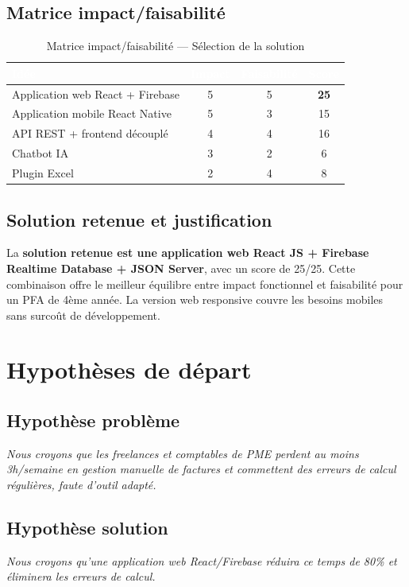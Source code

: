 \subsection{Matrice impact/faisabilité}

\begin{table}[H]
\centering
\caption{Matrice impact/faisabilité — Sélection de la solution}
\label{tab:matrice_impact}
\begin{tabular}{|l|c|c|c|}
\hline
\rowcolor{emsiblue}\textcolor{white}{\textbf{Idée}} & \textcolor{white}{\textbf{Impact}} & \textcolor{white}{\textbf{Faisabilité}} & \textcolor{white}{\textbf{Score}} \\
\hline
Application web React + Firebase & 5 & 5 & \textbf{25} \\
Application mobile React Native & 5 & 3 & 15 \\
API REST + frontend découplé & 4 & 4 & 16 \\
Chatbot IA & 3 & 2 & 6 \\
Plugin Excel & 2 & 4 & 8 \\
\hline
\end{tabular}
\end{table}

\subsection{Solution retenue et justification}

La \textbf{solution retenue est une application web React JS + Firebase Realtime Database + JSON Server}, avec un score de 25/25. Cette combinaison offre le meilleur équilibre entre impact fonctionnel et faisabilité pour un PFA de 4ème année. La version web responsive couvre les besoins mobiles sans surcoût de développement.

\section{Hypothèses de départ}

\subsection{Hypothèse problème}
\textit{Nous croyons que les freelances et comptables de PME perdent au moins 3h/semaine en gestion manuelle de factures et commettent des erreurs de calcul régulières, faute d'outil adapté.}

\subsection{Hypothèse solution}
\textit{Nous croyons qu'une application web React/Firebase réduira ce temps de 80\% et éliminera les erreurs de calcul.}

